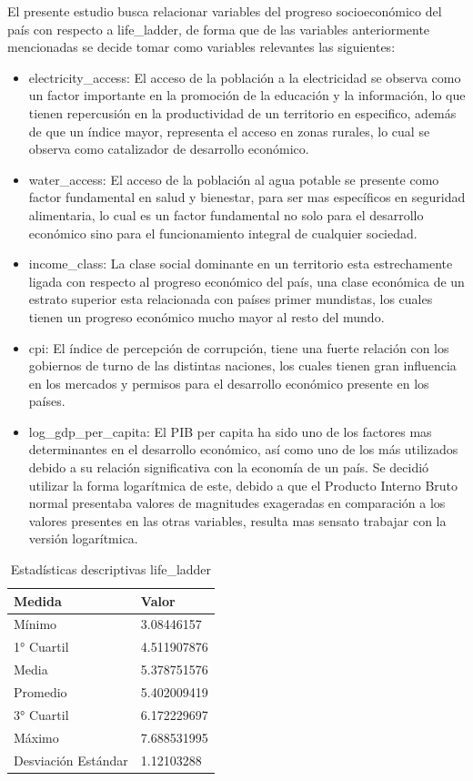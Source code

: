 El presente estudio busca relacionar variables del progreso socioeconómico del país con respecto a life\_ladder, de forma que de las variables anteriormente mencionadas se decide tomar como variables relevantes las siguientes:
\begin{itemize}
    \item electricity\_access: El acceso de la población a la electricidad se observa como un factor importante en la promoción de la educación y la información, lo que tienen repercusión en la productividad de un territorio en especifico, además de que un índice mayor, representa el acceso en zonas rurales, lo cual se observa como catalizador de desarrollo económico.
    \item water\_access: El acceso de la población al agua potable se presente como factor fundamental en salud y bienestar, para ser mas específicos en seguridad alimentaria, lo cual es un factor fundamental no solo para el desarrollo económico sino para el funcionamiento integral de cualquier sociedad.
    \item income\_class: La clase social dominante en un territorio esta estrechamente ligada con respecto al progreso económico del país, una clase económica de un estrato superior esta relacionada con países primer mundistas, los cuales tienen un progreso económico mucho mayor al resto del mundo.
    \item cpi: El índice de percepción de corrupción, tiene una fuerte relación con los gobiernos de turno de las distintas naciones, los cuales tienen gran influencia en los mercados y permisos para el desarrollo económico presente en los países.
    \item log\_gdp\_per\_capita: El PIB per capita ha sido uno de los factores mas determinantes en el desarrollo económico, así como uno de los más utilizados debido a su relación significativa con la economía de un país. Se decidió utilizar la forma logarítmica de este, debido a que el Producto Interno Bruto normal presentaba valores de magnitudes exageradas en comparación a los valores presentes en las otras variables, resulta mas sensato trabajar con la versión logarítmica.
\end{itemize}

\newpage

\begin{table}[!ht]
\caption{Estadísticas descriptivas life\_ladder}
    \centering
    \begin{tabular}{|l|l|}
    \hline
        Medida & Valor \\ \hline
        Mínimo & 3.08446157 \\ \hline
        1° Cuartil & 4.511907876 \\ \hline
        Media & 5.378751576 \\ \hline
        Promedio & 5.402009419 \\ \hline
        3° Cuartil & 6.172229697 \\ \hline
        Máximo & 7.688531995 \\ \hline
        Desviación Estándar & 1.12103288 \\ \hline
    \end{tabular}
\end{table}

